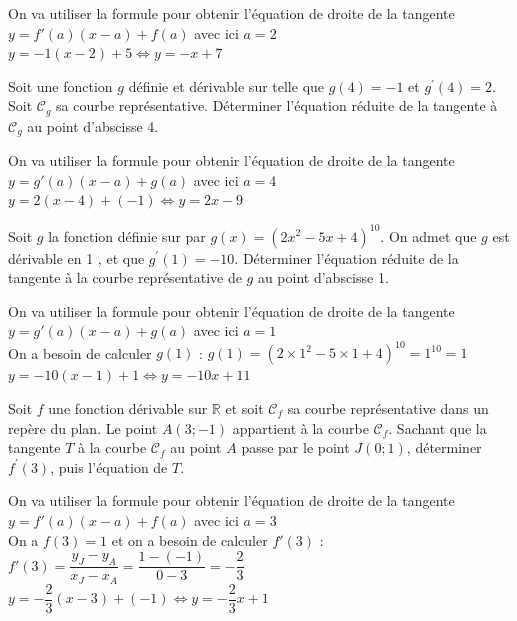 \documentclass[11pt,a4paper]{article}  %
\begin{document}
\begin{corrBox}
	On va utiliser la formule pour obtenir l'équation de droite de la tangente$y=f'(a)(x-a)+f(a)$ avec ici $a=2$\\
	$y=-1(x-2)+5 \iff y=-x+7$
\end{corrBox}

\exercice{}

Soit une fonction $g$ définie et dérivable sur \R telle que $g(4)=-1$ et $g^{\prime}(4)=2$. Soit $\mathscr{C}_g$ sa courbe représentative. Déterminer l'équation réduite de la tangente à $\mathscr{C}_g$ au point d'abscisse 4.

\begin{corrBox}
	On va utiliser la formule pour obtenir l'équation de droite de la tangente$y=g'(a)(x-a)+g(a)$ avec ici $a=4$\\
	$y=2(x-4)+(-1) \iff y=2x-9$
\end{corrBox}

\exercice{}

Soit $g$ la fonction définie sur \R par $g(x)=\left(2 x^2-5 x+4\right)^{10}$. On admet que $g$ est dérivable en 1 , et que $g^{\prime}(1)=-10$. Déterminer l'équation réduite de la tangente à la courbe représentative de $g$ au point d'abscisse 1.

\begin{corrBox}
	On va utiliser la formule pour obtenir l'équation de droite de la tangente $y=g'(a)(x-a)+g(a)$ avec ici $a=1$\\
	On a besoin de calculer $g(1)$ : $g(1)=\left(2\times1^2-5\times1+4\right)^{10}=1^{10}=1$\\
	$y=-10(x-1)+1 \iff y=-10x+11$
\end{corrBox}

\exercice{}

Soit $f$ une fonction dérivable sur $\mathbb{R}$ et soit $\mathscr{C}_f$ sa courbe représentative dans un repère du plan. Le point $A(3 ;-1)$ appartient à la courbe $\mathscr{C}_f$.
Sachant que la tangente $T$ à la courbe $\mathscr{C}_f$ au point $A$ passe par le point $J(0 ; 1)$, déterminer $f^{\prime}(3)$, puis l'équation de $T$.

\begin{corrBox}
	On va utiliser la formule pour obtenir l'équation de droite de la tangente $y=f'(a)(x-a)+f(a)$ avec ici $a=3$\\
	On a $f(3)=1$ et on a besoin de calculer $f'(3)$ : $f'(3)=\dfrac{y_J-y_A}{x_J-x_A}=\dfrac{1-(-1)}{0-3}=-\dfrac{2}{3}$\\
	$y=-\dfrac{2}{3}(x-3)+(-1) \iff y=-\dfrac{2}{3}x+1$
\end{corrBox}
\end{document}
